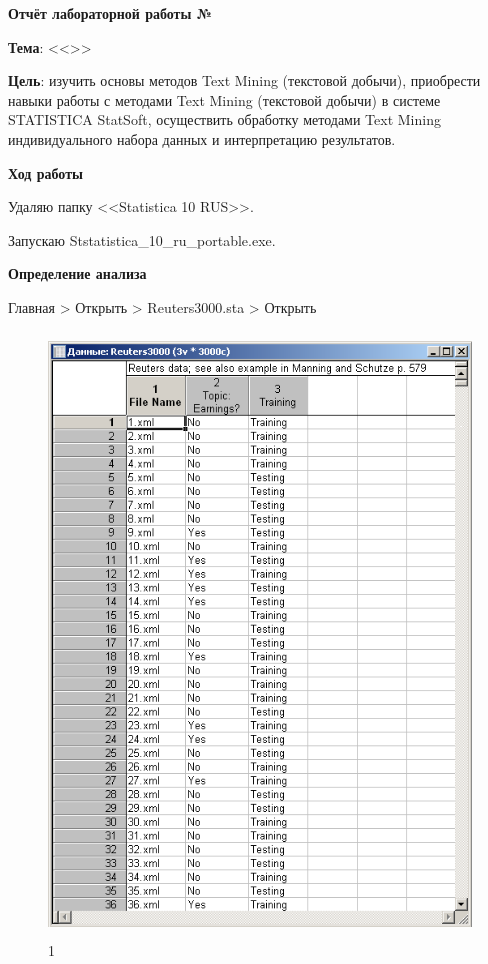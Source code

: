 \begin{center}
  \textbf{Отчёт лабораторной работы №\envReportLabNumber}
\end{center}

\textbf{Тема}:
<<\envReportTitle>>

\textbf{Цель}:
изучить основы методов Text Mining (текстовой добычи), приобрести
навыки работы с методами Text Mining (текстовой добычи) в системе
STATISTICA StatSoft, осуществить обработку методами Text Mining
индивидуального набора данных и интерпретацию результатов.

\begin{center}
  \textbf{Ход работы}
\end{center}

Удаляю папку <<Statistica 10 RUS>>.

Запускаю Ststatistica\_10\_ru\_portable.exe.

\begin{center}
  \textbf{Определение анализа}
\end{center}

Главная > Открыть > Reuters3000.sta  > Открыть

\begin{figure}[!h]
  \centering

  \includegraphics[height=16cm]
  {inc/1.PNG}

  \caption{1}

  \label{fig:1}
\end{figure}

